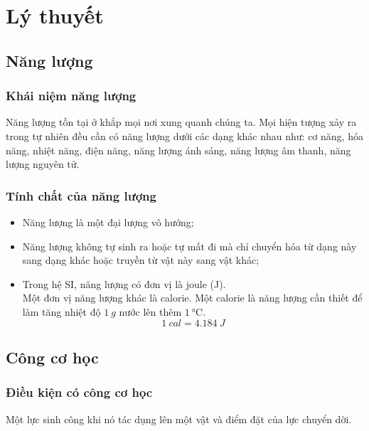 \setcounter{section}{0}
\section{Lý thuyết}
\subsection{Năng lượng}
\subsubsection{Khái niệm năng lượng}
Năng lượng tồn tại ở khắp mọi nơi xung quanh chúng ta. Mọi hiện tượng xảy ra trong tự nhiên đều cần có năng lượng dưới các dạng khác nhau như: cơ năng, hóa năng, nhiệt năng, điện năng, năng lượng ánh sáng, năng lượng âm thanh, năng lượng nguyên tử.
\subsubsection{Tính chất của năng lượng}
\begin{itemize}
	\item Năng lượng là một đại lượng vô hướng;
	\item Năng lượng không tự sinh ra hoặc tự mất đi mà chỉ chuyển hóa từ dạng này sang dạng khác hoặc truyền từ vật này sang vật khác;
	\item Trong hệ SI, năng lượng có đơn vị là joule (J).\\ Một đơn vị năng lượng khác là calorie. Một calorie là năng lượng cần thiết để làm tăng nhiệt độ $\SI{1}{g}$ nước lên thêm $\SI{1}{\celsius}$.
	$$\SI{1}{cal} = \SI{4.184}{J}$$
\end{itemize}

\subsection{Công cơ học}
	
	\subsubsection{Điều kiện có công cơ học}
	Một lực sinh công khi nó tác dụng lên một vật và điểm đặt của lực chuyển dời.
	
	

